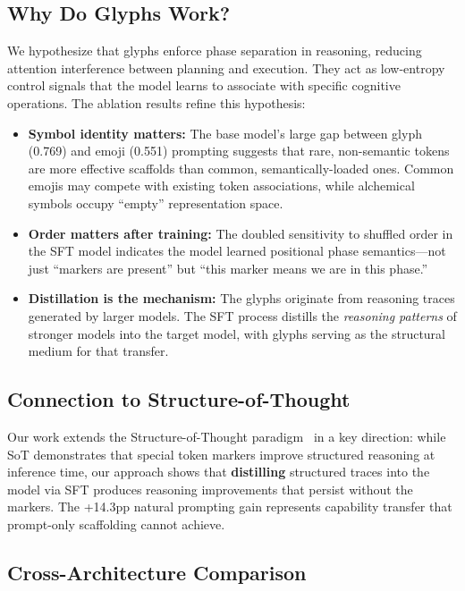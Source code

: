 \documentclass[11pt]{article}
\begin{document}
\subsection{Why Do Glyphs Work?}

We hypothesize that glyphs enforce phase separation in reasoning, reducing attention interference between planning and execution. They act as low-entropy control signals that the model learns to associate with specific cognitive operations. The ablation results refine this hypothesis:

\begin{itemize}
    \item \textbf{Symbol identity matters:} The base model's large gap between glyph (0.769) and emoji (0.551) prompting suggests that rare, non-semantic tokens are more effective scaffolds than common, semantically-loaded ones. Common emojis may compete with existing token associations, while alchemical symbols occupy ``empty'' representation space.
    \item \textbf{Order matters after training:} The doubled sensitivity to shuffled order in the SFT model indicates the model learned positional phase semantics---not just ``markers are present'' but ``this marker means we are in this phase.''
    \item \textbf{Distillation is the mechanism:} The glyphs originate from reasoning traces generated by larger models. The SFT process distills the \textit{reasoning patterns} of stronger models into the target model, with glyphs serving as the structural medium for that transfer.
\end{itemize}

\subsection{Connection to Structure-of-Thought}

Our work extends the Structure-of-Thought paradigm~\citep{t2sbench2025} in a key direction: while SoT demonstrates that special token markers improve structured reasoning at inference time, our approach shows that \textbf{distilling} structured traces into the model via SFT produces reasoning improvements that persist without the markers. The +14.3pp natural prompting gain represents capability transfer that prompt-only scaffolding cannot achieve.

\subsection{Cross-Architecture Comparison}
\end{document}
